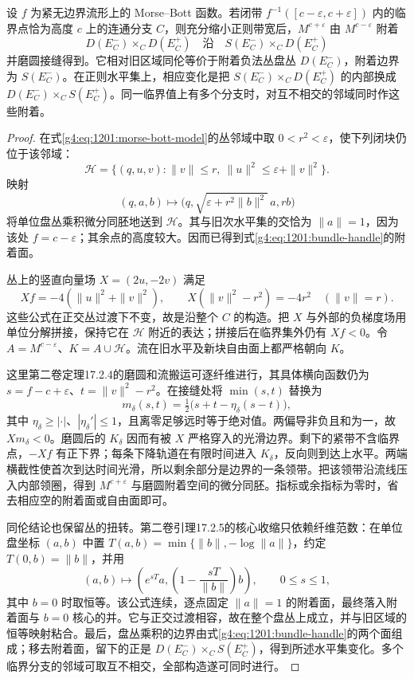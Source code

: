 \begin{proposition}\label{g4:prop:1201:critical-crossing}
	设 \(f\) 为紧无边界流形上的 Morse–Bott 函数。若闭带 \(f^{-1}([c-\varepsilon,c+\varepsilon])\) 内的临界点恰为高度 \(c\) 上的连通分支 \(C\)，则充分缩小正则带宽后，\(M^{c+\varepsilon}\) 由 \(M^{c-\varepsilon}\) 附着
	\begin{equation}\label{g4:eq:1201:bundle-handle}
		D(E_C^-)\mathbin{\times_C}D(E_C^+)
		\quad\text{沿}\quad
		S(E_C^-)\mathbin{\times_C}D(E_C^+)
	\end{equation}
	并磨圆接缝得到。它相对旧区域同伦等价于附着负法丛盘丛 \(D(E_C^-)\)，附着边界为 \(S(E_C^-)\)。在正则水平集上，相应变化是把 \(S(E_C^-)\times_C D(E_C^+)\) 的内部换成 \(D(E_C^-)\times_C S(E_C^+)\)。同一临界值上有多个分支时，对互不相交的邻域同时作这些附着。
\end{proposition}
\begin{proof}
	在式\eqref{g4:eq:1201:morse-bott-model}的丛邻域中取 \(0<r^2<\varepsilon\)，使下列闭块仍位于该邻域：
	\[
		\mathcal H=\{(q,u,v):\|v\|\leq r,
		\ \|u\|^2\leq\varepsilon+\|v\|^2\}.
	\]
	映射
	\[
		(q,a,b)\longmapsto
		\bigl(q,\sqrt{\varepsilon+r^2\|b\|^2}\,a,rb\bigr)
	\]
	将单位盘丛乘积微分同胚地送到 \(\mathcal H\)。其与旧次水平集的交恰为 \(\|a\|=1\)，因为该处 \(f=c-\varepsilon\)；其余点的高度较大。因而已得到式\eqref{g4:eq:1201:bundle-handle}的附着面。

	丛上的竖直向量场 \(X=(2u,-2v)\) 满足
	\[
		Xf=-4(\|u\|^2+\|v\|^2),\qquad
		X(\|v\|^2-r^2)=-4r^2\quad(\|v\|=r).
	\]
	这些公式在正交丛过渡下不变，故是沿整个 \(C\) 的构造。把 \(X\) 与外部的负梯度场用单位分解拼接，保持它在 \(\mathcal H\) 附近的表达；拼接后在临界集外仍有 \(Xf<0\)。令 \(A=M^{c-\varepsilon}\)、\(K=A\cup\mathcal H\)。流在旧水平及新块自由面上都严格朝向 \(K\)。

	这里第二卷定理17.2.4的磨圆和流搬运可逐纤维进行，其具体横向函数仍为 \(s=f-c+\varepsilon\)、\(t=\|v\|^2-r^2\)。在接缝处将 \(\min(s,t)\) 替换为
	\[
		m_\delta(s,t)=\tfrac12\bigl(s+t-\eta_\delta(s-t)\bigr),
	\]
	其中 \(\eta_\delta\geq|\cdot|\)、\(|\eta_\delta'|\leq1\)，且离零足够远时等于绝对值。两偏导非负且和为一，故 \(Xm_\delta<0\)。磨圆后的 \(K_\delta\) 因而有被 \(X\) 严格穿入的光滑边界。剩下的紧带不含临界点，\(-Xf\) 有正下界；每条下降轨道在有限时间进入 \(K_\delta\)，反向则到达上水平。两端横截性使首次到达时间光滑，所以剩余部分是边界的一条领带。把该领带沿流线压入内部领圈，得到 \(M^{c+\varepsilon}\) 与磨圆附着空间的微分同胚。指标或余指标为零时，省去相应空的附着面或自由面即可。

	同伦结论也保留丛的扭转。第二卷引理17.2.5的核心收缩只依赖纤维范数：在单位盘坐标 \((a,b)\) 中置 \(T(a,b)=\min\{\|b\|,-\log\|a\|\}\)，约定 \(T(0,b)=\|b\|\)，并用
	\[
		(a,b)\longmapsto
		\left(e^{sT}a,\left(1-\frac{sT}{\|b\|}\right)b\right),
		\qquad0\leq s\leq1,
	\]
	其中 \(b=0\) 时取恒等。该公式连续，逐点固定 \(\|a\|=1\) 的附着面，最终落入附着面与 \(b=0\) 核心的并。它与正交过渡相容，故在整个盘丛上成立，并与旧区域的恒等映射粘合。最后，盘丛乘积的边界由式\eqref{g4:eq:1201:bundle-handle}的两个面组成；移去附着面，留下的正是 \(D(E_C^-)\times_C S(E_C^+)\)，得到所述水平集变化。多个临界分支的邻域可取互不相交，全部构造遂可同时进行。
\end{proof}

